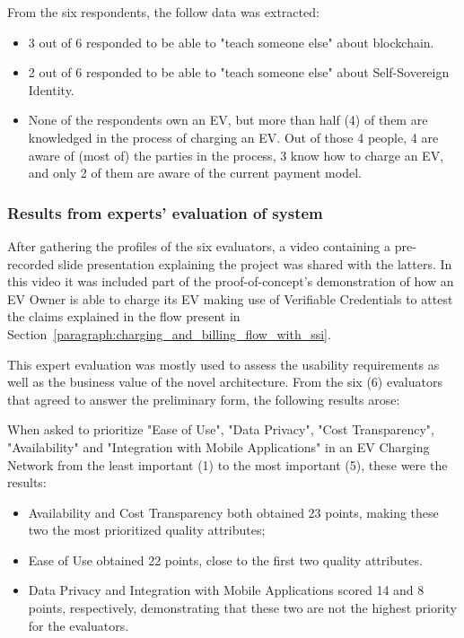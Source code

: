 From the six respondents, the follow data was extracted:

\begin{itemize}
    \item 3 out of 6 responded to be able to "teach someone else" about blockchain.
    \item 2 out of 6 responded to be able to "teach someone else" about Self-Sovereign Identity.
    \item None of the respondents own an EV, but more than half (4) of them are knowledged in the process of charging an EV. Out of those 4 people, 4 are aware of (most of) the parties in the process, 3 know how to charge an EV, and only 2 of them are aware of the current payment model.
\end{itemize}

\subsubsection{Results from experts' evaluation of system}
\label{subsubsec:results_from_experts_evaluation_of_system}

After gathering the profiles of the six evaluators, a video containing a pre-recorded slide presentation explaining the project was shared with the latters. In this video it was included part of the proof-of-concept's demonstration of how an EV Owner is able to charge its EV making use of Verifiable Credentials to attest the claims explained in the flow present in Section~\ref{paragraph:charging_and_billing_flow_with_ssi}.

This expert evaluation was mostly used to assess the usability requirements as well as the business value of the novel architecture. From the six (6) evaluators that agreed to answer the preliminary form, the following results arose:

When asked to prioritize "Ease of Use", "Data Privacy", "Cost Transparency", "Availability" and "Integration with Mobile Applications" in  an EV Charging Network from the least important (1) to the most important (5), these were the results:

\begin{itemize}
    \item Availability and Cost Transparency both obtained 23 points, making these two the most prioritized quality attributes;
    \item Ease of Use obtained 22 points, close to the first two quality attributes.
    \item Data Privacy and Integration with Mobile Applications scored 14 and 8 points, respectively, demonstrating that these two are not the highest priority for the evaluators.
\end{itemize}

